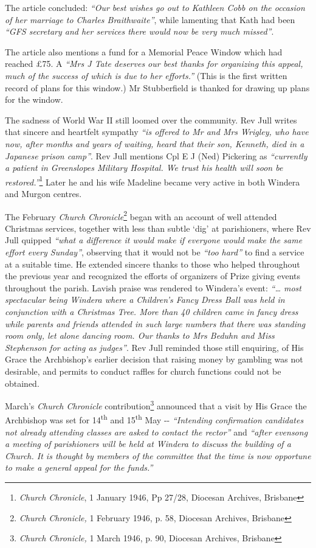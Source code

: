 The article concluded: \emph{``Our best wishes go out to Kathleen Cobb on the occasion of her marriage to Charles Braithwaite''}, while lamenting that Kath had been \emph{``GFS secretary and her services there would now be very much missed''}.

The article also mentions a fund for a Memorial Peace Window which had reached £75. A \emph{``Mrs J Tate deserves our best thanks for organizing this appeal, much of the success of which is due to her efforts.''} (This is the first written record of plans for this window.) Mr Stubberfield is thanked for drawing up plans for the window.

The sadness of World War II still loomed over the community. Rev Jull writes that sincere and heartfelt sympathy \emph{``is offered to Mr and Mrs Wrigley, who have now, after months and years of waiting, heard that their son, Kenneth, died in a Japanese prison camp''}. Rev Jull mentions Cpl E J (Ned) Pickering as \emph{``currently a patient in Greenslopes Military Hospital. We trust his health will soon be restored.''}\footnote{\emph{Church Chronicle}, 1 January 1946, Pp 27/28, Diocesan Archives, Brisbane} Later he and his wife Madeline became very active in both Windera and Murgon centres.

The February \emph{Church Chronicle}\footnote{\emph{Church Chronicle,} 1 February 1946, p. 58, Diocesan Archives, Brisbane} began with an account of well attended Christmas services, together with less than subtle `dig' at parishioners, where Rev Jull quipped \emph{``what a difference it would make if everyone would make the same effort every Sunday''}, observing that it would not be \emph{``too hard''} to find a service at a suitable time. He extended sincere thanks to those who helped throughout the previous year and recognized the efforts of organizers of Prize giving events throughout the parish. Lavish praise was rendered to Windera's event: \emph{``\ldots{} most spectacular being Windera where a Children's Fancy Dress Ball was held in conjunction with a Christmas Tree. More than 40 children came in fancy dress while parents and friends attended in such large numbers that there was standing room only, let alone dancing room. Our thanks to Mrs Beduhn and Miss Stephenson for acting as judges''}. Rev Jull reminded those still enquiring, of His Grace the Archbishop's earlier decision that raising money by gambling was not desirable, and permits to conduct raffles for church functions could not be obtained.

March's \emph{Church Chronicle} contribution\footnote{\emph{Church Chronicle,} 1 March 1946, p. 90, Diocesan Archives, Brisbane} announced that a visit by His Grace the Archbishop was set for 14\textsuperscript{th} and 15\textsuperscript{th} May -\/- \emph{``Intending confirmation candidates not already attending classes are asked to contact the rector''} and \emph{``after evensong a meeting of parishioners will be held at Windera to discuss the building of a Church. It is thought by members of the committee that the time is now opportune to make a general appeal for the funds.''}

